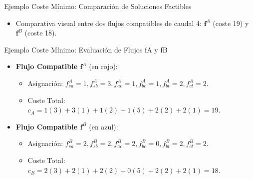 \documentclass[
  ignorenonframetext,
]{beamer}
\providecommand{\tightlist}{%
  \setlength{\itemsep}{0pt}\setlength{\parskip}{0pt}}
\begin{document}
\begin{frame}{Ejemplo Coste Mínimo: Comparación de Soluciones Factibles}
\label{ejemplo-coste-muxednimo-comparaciuxf3n-de-soluciones-factibles}
\begin{itemize}
\tightlist
\item
  Comparativa visual entre dos flujos compatibles de caudal 4:
  \(\mathbf{f}^A\) (coste 19) y \(\mathbf{f}^B\) (coste 18).
\end{itemize}
\end{frame}

\begin{frame}{Ejemplo Coste Mínimo: Evaluación de Flujos fA y fB}
\label{ejemplo-coste-muxednimo-evaluaciuxf3n-de-flujos-fa-y-fb}
\begin{itemize}
\tightlist
\item
  \textbf{Flujo Compatible \(\mathbf{f}^A\)} (en rojo):

  \begin{itemize}
  \tightlist
  \item
    Asignación:
    \(f_{sa}^A=1, f_{sb}^A=3, f_{ac}^A=1, f_{bc}^A=1, f_{bt}^A=2, f_{ct}^A=2\).
  \item
    Coste Total: \(c_A = 1(3) + 3(1) + 1(2) + 1(5) + 2(2) + 2(1) = 19\).
  \end{itemize}
\item
  \textbf{Flujo Compatible \(\mathbf{f}^B\)} (en azul):

  \begin{itemize}
  \tightlist
  \item
    Asignación:
    \(f_{sa}^B=2, f_{sb}^B=2, f_{ac}^B=2, f_{bc}^B=0, f_{bt}^B=2, f_{ct}^B=2\).
  \item
    Coste Total: \(c_B = 2(3) + 2(1) + 2(2) + 0(5) + 2(2) + 2(1) = 18\).
  \end{itemize}
\end{itemize}
\end{frame}
\end{document}
